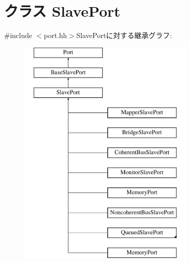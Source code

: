 \hypertarget{classSlavePort}{
\section{クラス SlavePort}
\label{classSlavePort}
}


{\ttfamily \#include $<$port.hh$>$}SlavePortに対する継承グラフ:\begin{figure}[H]
\begin{center}
\leavevmode
\includegraphics[height=11cm]{classSlavePort}
\end{center}
\end{figure}
